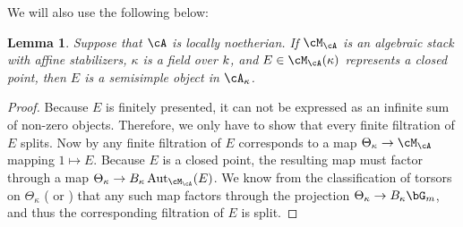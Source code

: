 \documentclass[a4paper]{amsart}
\numberwithin{equation}{section}
\theoremstyle{plain}
\newtheorem{lem}[thm]{Lemma}
\theoremstyle{definition}
\DeclareMathOperator{\Aut}{Aut}
\begin{document}
We will also use the following below:

\begin{lem} \label{L:abelian_semi_simple}
Suppose that $\cA$ is locally noetherian.  If $\cM_\cA$ is an algebraic stack with affine stabilizers, $\kappa$ is a field over ${k}$, and $E \in \cM_{\cA}(\kappa)$ represents a closed point, then $E$ is a semisimple object in $\cA_{\kappa}$. 
\end{lem}
\begin{proof}
	Because $E$ is finitely presented, it can not be expressed as an infinite sum of non-zero objects. Therefore, we only have to show that every finite filtration of $E$ splits. Now by  any finite filtration of $E$ corresponds to a map $\Theta_{\kappa} \to \cM_{\cA}$ mapping $1 \mapsto E$. Because $E$ is a closed point, the resulting map must factor through a map $\Theta_{\kappa} \to B_{\kappa}\Aut_{\cM_{\cA}} (E)$. 
	We know from the classification of torsors on $\Theta_{\kappa}$ (\cite[Lem.~1.7]{heinloth-stability} or \cite[Prop.~A.0.1]{hlinstability}) that any such map factors through the projection $\Theta_{\kappa} \to B_{\kappa}\bG_m$, and thus the corresponding filtration of $E$ is split.
\end{proof}
\end{document}
